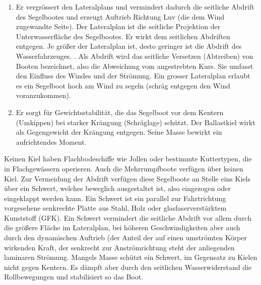 \begin{enumerate}
    \item Er vergrössert den Lateralplans und vermindert dadurch die seitliche Abdrift des Segelbootes und erzeugt Auftrieb Richtung Luv  (die dem Wind zugewandte Seite). Der Lateralplan ist die seitliche Projektion der Unterwasserfläche des Segelbootes. Er wirkt dem seitlichen Abdriften entgegen. Je größer der Lateralplan ist, desto geringer ist die Abdrift des Wasserfahrzeuges. \cite{noauthor_lateralplan_2020}. Als Abdrift wird das seitliche Versetzen (Abtreiben) von Booten bezeichnet, also die Abweichung vom angestrebten Kurs. Sie umfasst den Einfluss des Windes und der  Strömung.  \cite{noauthor_abdrift_2023}    Ein grosser Lateralplan erlaubt es ein Segelboot hoch am Wind zu segeln (schräg entgegen den Wind voranzukommen). \cite{noauthor_lateralplan_2020}

\item Er sorgt für Gewichtsstabilität, die das Segelboot vor dem Kentern (Umkippen) bei starker Krängung (Schräglage) schützt. Der Ballastkiel wirkt als Gegengewicht der Krängung entgegen. Seine Masse  bewirkt  ein aufrichtendes Moment. \cite{noauthor_stabilitat_2023}
\end{enumerate}

Keinen Kiel haben Flachbodeschiffe wie Jollen oder bestimmte Kuttertypen, die in Flachgewässern operieren. Auch die Mehrrumpfboote verfügen über keinen Kiel. Zur Vermeidung der Abdrift verfügen diese Segelboote an Stelle eins Kiels über ein Schwert, welches beweglich ausgestaltet ist, also eingezogen oder eingeklappt werden kann. Ein Schwert ist ein parallel zur Fahrtrichtung vorgesehene senkrechte Platte aus Stahl, Holz oder glasfaserverstärktem Kunststoff (GFK). 
Ein Schwert vermindert die seitliche Abdrift vor allem durch die größere Fläche im Lateralplan, bei höheren Geschwindigkeiten aber auch durch den dynamischen Auftrieb (der Anteil der auf einen umströmten Körper wirkenden Kraft, der senkrecht zur Anströmrichtung steht  \cite{noauthor_dynamischer_2023} der anliegenden laminaren Strömung. Mangels Masse schützt ein Schwert, im Gegensatz zu Kielen nicht gegen Kentern. Es dämpft aber durch den seitlichen Wasserwiderstand die Rollbewegungen und stabilisiert so das Boot. \cite{noauthor_schwert_2023}



